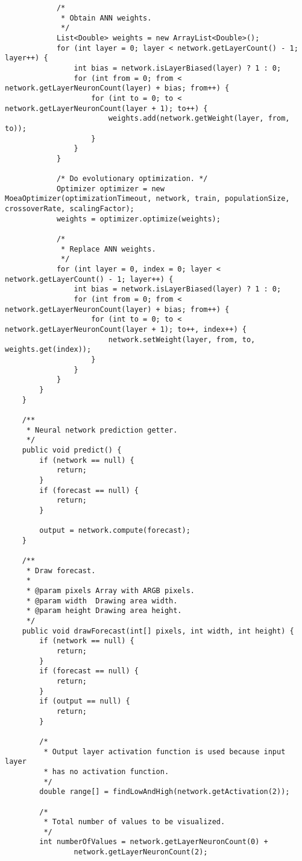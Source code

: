 \begin{verbatim}
            /*
             * Obtain ANN weights.
             */
            List<Double> weights = new ArrayList<Double>();
            for (int layer = 0; layer < network.getLayerCount() - 1; layer++) {
                int bias = network.isLayerBiased(layer) ? 1 : 0;
                for (int from = 0; from < network.getLayerNeuronCount(layer) + bias; from++) {
                    for (int to = 0; to < network.getLayerNeuronCount(layer + 1); to++) {
                        weights.add(network.getWeight(layer, from, to));
                    }
                }
            }

            /* Do evolutionary optimization. */
            Optimizer optimizer = new MoeaOptimizer(optimizationTimeout, network, train, populationSize, crossoverRate, scalingFactor);
            weights = optimizer.optimize(weights);

            /*
             * Replace ANN weights.
             */
            for (int layer = 0, index = 0; layer < network.getLayerCount() - 1; layer++) {
                int bias = network.isLayerBiased(layer) ? 1 : 0;
                for (int from = 0; from < network.getLayerNeuronCount(layer) + bias; from++) {
                    for (int to = 0; to < network.getLayerNeuronCount(layer + 1); to++, index++) {
                        network.setWeight(layer, from, to, weights.get(index));
                    }
                }
            }
        }
    }

    /**
     * Neural network prediction getter.
     */
    public void predict() {
        if (network == null) {
            return;
        }
        if (forecast == null) {
            return;
        }

        output = network.compute(forecast);
    }

    /**
     * Draw forecast.
     *
     * @param pixels Array with ARGB pixels.
     * @param width  Drawing area width.
     * @param height Drawing area height.
     */
    public void drawForecast(int[] pixels, int width, int height) {
        if (network == null) {
            return;
        }
        if (forecast == null) {
            return;
        }
        if (output == null) {
            return;
        }

        /*
         * Output layer activation function is used because input layer
         * has no activation function.
         */
        double range[] = findLowAndHigh(network.getActivation(2));

        /*
         * Total number of values to be visualized.
         */
        int numberOfValues = network.getLayerNeuronCount(0) +
                network.getLayerNeuronCount(2);


\end{verbatim}
